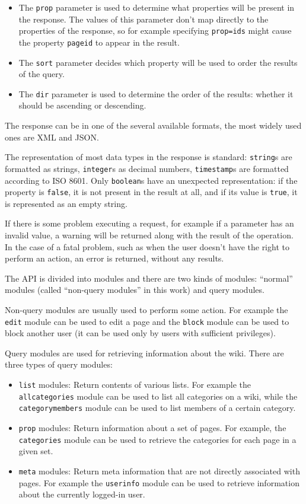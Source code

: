 \begin{itemize}
\item The \texttt{prop} parameter is used to determine what properties will be present in the response.
The values of this parameter don't map directly to the properties of the response,
so for example specifying \texttt{prop=ids} might cause the property \texttt{pageid} to appear in the result.
\item The \texttt{sort} parameter decides which property will be used to order the results of the query.
\item The \texttt{dir} parameter is used to determine the order of the results:
whether it should be ascending or descending.
\end{itemize}

The response can be in one of the several available formats, the most widely used ones are \ac{XML} and \ac{JSON}.

The representation of most data types in the response is standard:
\texttt{string}s are formatted as strings, \texttt{integer}s as decimal numbers,
\texttt{timestamp}s are formatted according to ISO 8601.
Only \texttt{boolean}s have an unexpected representation:
if the property is \texttt{false}, it is not present in the result at all,
and if its value is \texttt{true}, it is represented as an empty string.

If there is some problem executing a request, for example if a parameter has an invalid value,
a warning will be returned along with the result of the operation.
In the case of a fatal problem, such as when the user doesn't have the right to perform an action,
an error is returned, without any results.

\medskip

The \ac{API} is divided into modules and there are two kinds of modules:
“normal” modules (called “non-query modules” in this work) and query modules.

Non-query modules are usually used to perform some action.
For example the \texttt{edit} module can be used to edit a page
and the \texttt{block} module can be used to block another user (it can be used only by users with sufficient privileges).

Query modules are used for retrieving information about the wiki. There are three types of query modules:

\begin{itemize}
\item \texttt{list} modules: Return contents of various lists.
For example the \texttt{all\-categories} module can be used to list all categories on a wiki,
while the \texttt{categorymembers} module can be used to list members of a certain category.
\item \texttt{prop} modules: Return information about a set of pages.
For example, the \texttt{categories} module can be used to retrieve the categories for each page in a given set.
\item \texttt{meta} modules: Return meta information that are not directly associated with pages.
For example the \texttt{userinfo} module can be used to retrieve information about the currently logged-in user.
\end{itemize}

